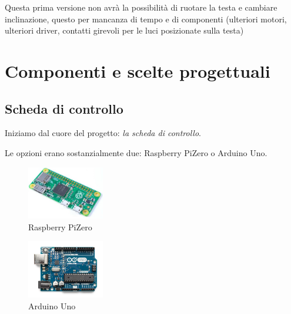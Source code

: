 \documentclass[12pt]{article}
\newcommand{\imgsz}{0.3\textwidth}
\newcommand{\raspi}{Raspberry Pi}
\newcommand{\raszero} {\raspi Zero}
\begin{document}
Questa prima versione non avrà la possibilità di ruotare la testa e cambiare inclinazione, questo per mancanza di tempo e di componenti (ulteriori motori, ulteriori driver, contatti girevoli per le luci posizionate sulla testa)
 
\section{Componenti e scelte progettuali}
\subsection{Scheda di controllo}
Iniziamo dal cuore del progetto: \emph{la scheda di controllo}.

Le opzioni erano sostanzialmente due: \raszero{} o Arduino Uno.

\begin{figure}[h]
\includegraphics[width=\imgsz]{rpi0}
\centering
\caption{\raszero}
\label{fig:rpi0}
\end{figure}

\begin{figure}[h]
\includegraphics[width=\imgsz]{Uno}
\centering
\caption{Arduino Uno}
\label{fig:uno}
\end{figure}
\end{document}
